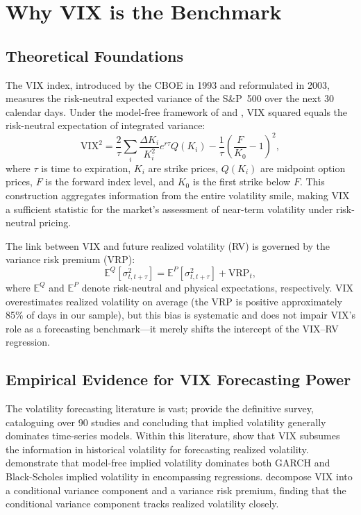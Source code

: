 \documentclass[12pt,a4paper]{article}
\begin{document}
\section{Why VIX is the Benchmark}
\label{sec:whyvix}

\subsection{Theoretical Foundations}

The VIX index, introduced by the CBOE in 1993 and reformulated in 2003, measures the risk-neutral expected variance of the S\&P~500 over the next 30 calendar days. Under the model-free framework of \citet{britten2000} and \citet{jiang2005}, VIX squared equals the risk-neutral expectation of integrated variance:
\begin{equation}
\text{VIX}^2 = \frac{2}{\tau} \sum_i \frac{\Delta K_i}{K_i^2} e^{r\tau} Q(K_i) - \frac{1}{\tau}\left(\frac{F}{K_0}-1\right)^2,
\label{eq:vix}
\end{equation}
where $\tau$ is time to expiration, $K_i$ are strike prices, $Q(K_i)$ are midpoint option prices, $F$ is the forward index level, and $K_0$ is the first strike below $F$. This construction aggregates information from the entire volatility smile, making VIX a sufficient statistic for the market's assessment of near-term volatility under risk-neutral pricing.

The link between VIX and future realized volatility (RV) is governed by the variance risk premium (VRP):
\begin{equation}
\mathbb{E}^Q[\sigma^2_{t,t+\tau}] = \mathbb{E}^P[\sigma^2_{t,t+\tau}] + \text{VRP}_t,
\label{eq:vrp}
\end{equation}
where $\mathbb{E}^Q$ and $\mathbb{E}^P$ denote risk-neutral and physical expectations, respectively. VIX overestimates realized volatility on average (the VRP is positive approximately 85\% of days in our sample), but this bias is systematic and does not impair VIX's role as a forecasting benchmark---it merely shifts the intercept of the VIX--RV regression.

\subsection{Empirical Evidence for VIX Forecasting Power}

The volatility forecasting literature is vast; \citet{poon2003} provide the definitive survey, cataloguing over 90 studies and concluding that implied volatility generally dominates time-series models. Within this literature, \citet{christensen1998} show that VIX subsumes the information in historical volatility for forecasting realized volatility. \citet{jiang2005} demonstrate that model-free implied volatility dominates both GARCH and Black-Scholes implied volatility in encompassing regressions. \citet{bekaert2014} decompose VIX into a conditional variance component and a variance risk premium, finding that the conditional variance component tracks realized volatility closely.
\end{document}
